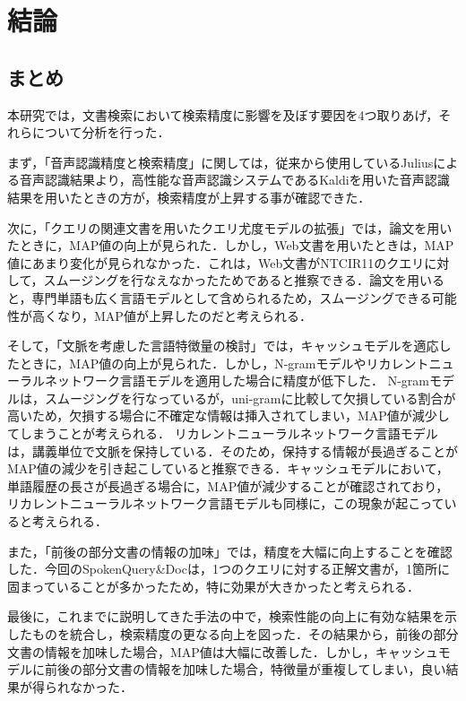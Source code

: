 
\chapter{結論} 
\section{まとめ}
本研究では，文書検索において検索精度に影響を及ぼす要因を4つ取りあげ，それらについて分析を行った．

まず，「音声認識精度と検索精度」に関しては，従来から使用しているJuliusによる音声認識結果より，高性能な音声認識システムであるKaldiを用いた音声認識結果を用いたときの方が，検索精度が上昇する事が確認できた．

次に，「クエリの関連文書を用いたクエリ尤度モデルの拡張」では，論文を用いたときに，MAP値の向上が見られた．しかし，Web文書を用いたときは，MAP値にあまり変化が見られなかった．これは，Web文書がNTCIR11のクエリに対して，スムージングを行なえなかったためであると推察できる．論文を用いると，専門単語も広く言語モデルとして含められるため，スムージングできる可能性が高くなり，MAP値が上昇したのだと考えられる．

そして，「文脈を考慮した言語特徴量の検討」では，キャッシュモデルを適応したときに，MAP値の向上が見られた．しかし，N-gramモデルやリカレントニューラルネットワーク言語モデルを適用した場合に精度が低下した．
N-gramモデルは，スムージングを行なっているが，uni-gramに比較して欠損している割合が高いため，欠損する場合に不確定な情報は挿入されてしまい，MAP値が減少してしまうことが考えられる．
リカレントニューラルネットワーク言語モデルは，講義単位で文脈を保持している．そのため，保持する情報が長過ぎることがMAP値の減少を引き起こしていると推察できる．キャッシュモデルにおいて，単語履歴の長さが長過ぎる場合に，MAP値が減少することが確認されており，リカレントニューラルネットワーク言語モデルも同様に，この現象が起こっていると考えられる．

また，「前後の部分文書の情報の加味」では，精度を大幅に向上することを確認した．今回のSpokenQuery\&Docは，1つのクエリに対する正解文書が，1箇所に固まっていることが多かったため，特に効果が大きかったと考えられる．

最後に，これまでに説明してきた手法の中で，検索性能の向上に有効な結果を示したものを統合し，検索精度の更なる向上を図った．その結果から，前後の部分文書の情報を加味した場合，MAP値は大幅に改善した．しかし，キャッシュモデルに前後の部分文書の情報を加味した場合，特徴量が重複してしまい，良い結果が得られなかった．

